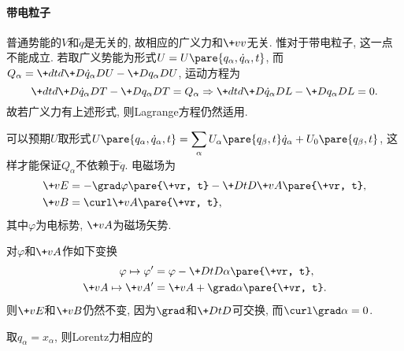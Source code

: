 \documentclass[../LectureNotes.tex]{subfiles}
\begin{document}
\paragraph{带电粒子} %
\label{par:带电粒子}

普通势能的$V$和$\dot{q}$是无关的, 故相应的广义力和$\+vv$无关. 惟对于带电粒子, 这一点不能成立. 若取广义势能为形式$U = U\pare{q_\alpha, \dot{q}_\alpha, t}$, 而$Q_\alpha = \displaystyle \+dtd{} \+D{\dot{q}_\alpha}DU - \+D{q_\alpha}DU$, 运动方程为
\[ \+dtd{} \+D{\dot{q}_\alpha}DT - \+D{q_\alpha}DT = Q_\alpha \Rightarrow \+dtd{} \+D{\dot{q}_\alpha}DL - \+D{q_\alpha}DL = 0. \]
故若广义力有上述形式, 则Lagrange方程仍然适用.
\par
可以预期$U$取形式$U\pare{q_\alpha, \dot{q}_\alpha, t} = \displaystyle \sum_\alpha U_\alpha\pare{q_\beta,t}\dot{q}_\alpha + U_0\pare{q_\beta, t}$, 这样才能保证$Q_\alpha$不依赖于$\ddot{q}$. 电磁场为
\begin{align*}
    \+vE &= -\grad \varphi\pare{\+vr, t} - \+DtD{\+vA\pare{\+vr, t}},\\
    \+vB &= \curl \+vA\pare{\+vr, t},
\end{align*}
其中$\varphi$为电标势, $\+vA$为磁场矢势.
\begin{remark}[规范不变性]
    对$\varphi$和$\+vA$作如下变换
    \begin{align*}
        \varphi \mapsto \varphi' &= \varphi - \+DtD{}\alpha\pare{\+vr, t}, \\
        \+vA \mapsto \+vA' &= \+vA + \grad \alpha\pare{\+vr, t}.
    \end{align*}
    则$\+vE$和$\+vB$仍然不变, 因为$\grad$和$\displaystyle \+DtD{}$可交换, 而$\curl\grad\alpha = 0$.
\end{remark}
取$q_\alpha = x_\alpha$, 则Lorentz力相应的
\end{document}
